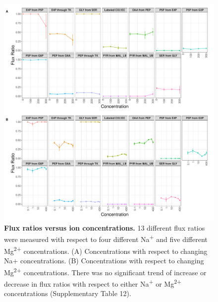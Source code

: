 \documentclass[a4paper]{article}
\begin{document}
\clearpage
\begin{figure}[!htb]
	\includegraphics[width=1\textwidth]{../../e_figures/Exp.pdf}
	\caption[Flux ratios versus ion concentrations]
	{\textbf{Flux ratios versus ion concentrations.} 13 different flux ratios were measured with respect to four different Na\textsuperscript{+} and five different Mg\textsuperscript{2+} concentrations. (A) Concentrations with respect to changing Na+ concentrations. (B) Concentrations with respect to changing Mg\textsuperscript{2+} concentrations. There was no significant trend of increase or decrease in flux ratios with respect to either Na\textsuperscript{+} or Mg\textsuperscript{2+} concentrations (Supplementary Table 12).}
\end{figure}
\end{document}
